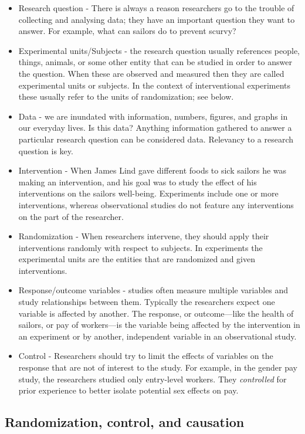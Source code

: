 \documentclass[
]{book}
\providecommand{\tightlist}{%
  \setlength{\itemsep}{0pt}\setlength{\parskip}{0pt}}
\theoremstyle{definition}
\theoremstyle{definition}
\theoremstyle{definition}
\theoremstyle{definition}
\theoremstyle{remark}
\begin{document}
\begin{itemize}
\tightlist
\item
  Research question - There is always a reason researchers go to the trouble of collecting and analysing data; they have an important question they want to answer. For example, what can sailors do to prevent scurvy?
\item
  Experimental units/Subjects - the research question usually references people, things, animals, or some other entity that can be studied in order to answer the question. When these are observed and measured then they are called experimental units or subjects. In the context of interventional experiments these usually refer to the units of randomization; see below.
\item
  Data - we are inundated with information, numbers, figures, and graphs in our everyday lives. Is this data? Anything information gathered to answer a particular research question can be considered data. Relevancy to a research question is key.
\item
  Intervention - When James Lind gave different foods to sick sailors he was making an intervention, and his goal was to study the effect of his interventions on the sailors well-being. Experiments include one or more interventions, whereas observational studies do not feature any interventions on the part of the researcher.
\item
  Randomization - When researchers intervene, they should apply their interventions randomly with respect to subjects. In experiments the experimental units are the entities that are randomized and given interventions.
\item
  Response/outcome variables - studies often measure multiple variables and study relationships between them. Typically the researchers expect one variable is affected by another. The response, or outcome---like the health of sailors, or pay of workers---is the variable being affected by the intervention in an experiment or by another, independent variable in an observational study.
\item
  Control - Researchers should try to limit the effects of variables on the response that are not of interest to the study. For example, in the gender pay study, the researchers studied only entry-level workers. They \emph{controlled} for prior experience to better isolate potential sex effects on pay.
\end{itemize}

\hypertarget{randomization-control-and-causation}{%
\subsection{Randomization, control, and causation}\label{randomization-control-and-causation}}
\end{document}
